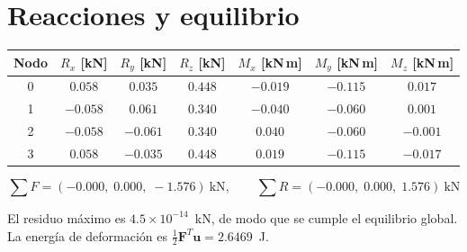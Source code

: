 \documentclass[11pt,a4paper]{article}
\begin{document}
\section{Reacciones y equilibrio}

\begin{center}
\begin{minipage}{\linewidth}
\centering
{}\label{tab:viga3d-reacciones}
\begin{tabular}{@{}ccccccc@{}}
\toprule
Nodo & $R_x$ [kN] & $R_y$ [kN] & $R_z$ [kN] & $M_x$ [kN\,m] & $M_y$ [kN\,m] & $M_z$ [kN\,m] \\
\midrule
0 & $0.058$ & $0.035$ & $0.448$ & $-0.019$ & $-0.115$ & $0.017$ \\
1 & $-0.058$ & $0.061$ & $0.340$ & $-0.040$ & $-0.060$ & $0.001$ \\
2 & $-0.058$ & $-0.061$ & $0.340$ & $0.040$ & $-0.060$ & $-0.001$ \\
3 & $0.058$ & $-0.035$ & $0.448$ & $0.019$ & $-0.115$ & $-0.017$ \\
\bottomrule
\end{tabular}
\end{minipage}
\end{center}

\begin{equation*}
\textstyle\sum F=(-0.000,\;0.000,\;-1.576)~\text{kN},\qquad \sum R=(-0.000,\;0.000,\;1.576)~\text{kN}
\end{equation*}

El residuo máximo es $4.5\times 10^{-14}$~kN, de modo que se cumple el equilibrio global. La energía de deformación es $\tfrac12\mathbf F^T\mathbf u=2.6469$~J.
\end{document}
